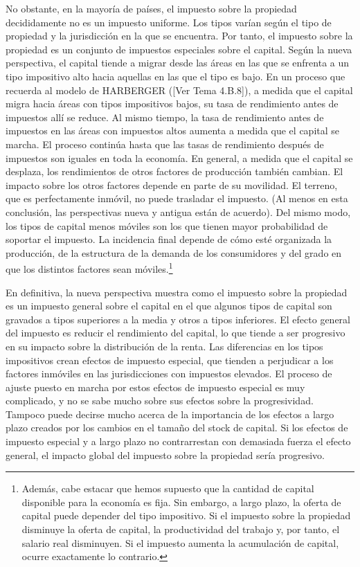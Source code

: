 \documentclass[10pt,a4paper]{article}
\newcommand{\authorfont}[1]{{\fontfamily{EBGaramond-TLF}\selectfont #1}}
\begin{document}
No obstante, en la mayoría de países, el impuesto sobre la propiedad decididamente no es un impuesto uniforme. Los tipos varían según el tipo de propiedad y la jurisdicción en la que se encuentra. Por tanto, el impuesto sobre la propiedad es un conjunto de impuestos especiales sobre el capital. Según la nueva perspectiva, el capital tiende a migrar desde las áreas en las que se enfrenta a un tipo impositivo alto hacia aquellas en las que el tipo es bajo. En un proceso que recuerda al modelo de HARBERGER ([\authorfont{Ver Tema 4.B.8}]), a medida que el capital migra hacia áreas con tipos impositivos bajos, su tasa de rendimiento antes de impuestos allí se reduce. Al mismo tiempo, la tasa de rendimiento antes de impuestos en las áreas con impuestos altos aumenta a medida que el capital se marcha. El proceso continúa hasta que las tasas de rendimiento después de impuestos son iguales en toda la economía. En general, a medida que el capital se desplaza, los rendimientos de otros factores de producción también cambian. El impacto sobre los otros factores depende en parte de su movilidad. El terreno, que es perfectamente inmóvil, no puede trasladar el impuesto. (Al menos en esta conclusión, las perspectivas nueva y antigua están de acuerdo). Del mismo modo, los tipos de capital menos móviles son los que tienen mayor probabilidad de soportar el impuesto. La incidencia final depende de cómo esté organizada la producción, de la estructura de la demanda de los consumidores y del grado en que los distintos factores sean móviles.\footnote{%
    Además, cabe estacar que hemos supuesto que la cantidad de capital disponible para la economía es fija. Sin embargo, a largo plazo, la oferta de capital puede depender del tipo impositivo. Si el impuesto sobre la propiedad disminuye la oferta de capital, la productividad del trabajo y, por tanto, el salario real disminuyen. Si el impuesto aumenta la acumulación de capital, ocurre exactamente lo contrario.
}

En definitiva, la nueva perspectiva muestra como el impuesto sobre la propiedad es un impuesto general sobre el capital en el que algunos tipos de capital son gravados a tipos superiores a la media y otros a tipos inferiores. El efecto general del impuesto es reducir el rendimiento del capital, lo que tiende a ser progresivo en su impacto sobre la distribución de la renta. Las diferencias en los tipos impositivos crean efectos de impuesto especial, que tienden a perjudicar a los factores inmóviles en las jurisdicciones con impuestos elevados. El proceso de ajuste puesto en marcha por estos efectos de impuesto especial es muy complicado, y no se sabe mucho sobre sus efectos sobre la progresividad. Tampoco puede decirse mucho acerca de la importancia de los efectos a largo plazo creados por los cambios en el tamaño del stock de capital. Si los efectos de impuesto especial y a largo plazo no contrarrestan con demasiada fuerza el efecto general, el impacto global del impuesto sobre la propiedad sería progresivo.
\end{document}

